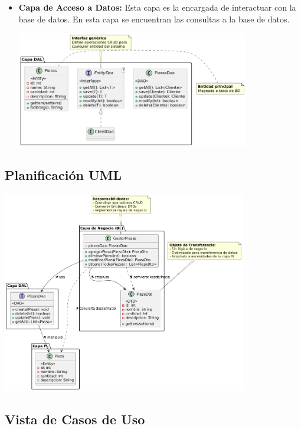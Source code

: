 \begin{itemize}
\begin{center}
    \newline
    \end{center}
    \item \textbf{Capa de Acceso a Datos:} Esta capa es la encargada de interactuar con la base de datos. 
    En esta capa se encuentran las consultas a la base de datos.
    \newline
    \begin{center}
        \includegraphics[width=0.8\textwidth]{imag/ImagenDiagramaUmlCapaAccesoDatos.png}
        \newline
    \end{center}
\end{itemize}
\subsection*{\centering Planificación UML}
    \begin{center}
        \includegraphics[width=0.8\textwidth]{imag/imagenDiagramaumlcapadePresentacion.png}
        \newline
    \end{center}
    \newpage
\subsection*{\centering Vista de Casos de Uso}

